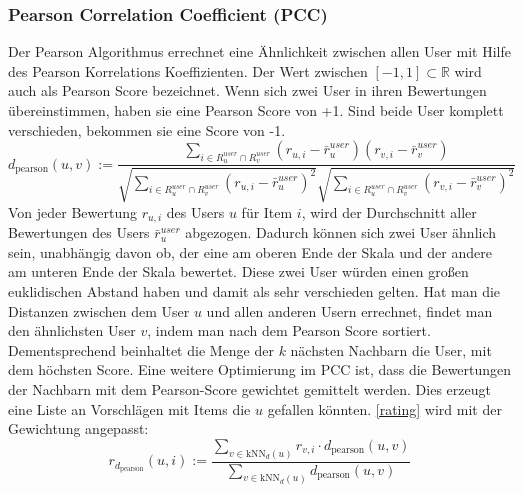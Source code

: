 \subsubsection{Pearson Correlation Coefficient (PCC)}\label{s.pearson}
Der Pearson Algorithmus errechnet eine Ähnlichkeit zwischen allen User mit Hilfe des Pearson Korrelations Koeffizienten. Der Wert zwischen $[-1,1]\subset \mathbb{R}$ wird auch als Pearson Score bezeichnet. Wenn sich zwei User in ihren Bewertungen übereinstimmen, haben sie eine Pearson Score von +1. Sind beide User komplett verschieden, bekommen sie eine Score von -1. 
\begin{equation}
	d_{\mathrm{pearson}}(u,v) := \dfrac{\sum\limits_{i \in R^{user}_{u}\cap R^{user}_{v}} (r_{u,i}-\bar{r}^{user}_{u})(r_{v,i}-\bar{r}^{user}_{v})}  {\sqrt{\sum\limits_{i \in R^{user}_{u}\cap R^{user}_{v}}(r_{u,i}-\bar{r}^{user}_{u})^2}\sqrt{\sum\limits_{i \in R^{user}_{u}\cap R^{user}_{v}}(r_{v,i}-\bar{r}^{user}_{v})^2}}
	 	\label{pccformula}
\end{equation}
Von jeder Bewertung $r_{u,i}$ des Users $u$ für Item $i$, wird der Durchschnitt aller Bewertungen des Users $\bar{r}^{user}_{u}$ abgezogen. Dadurch können sich zwei User ähnlich sein, unabhängig davon ob, der eine am oberen Ende der Skala und der andere am unteren Ende der Skala bewertet.
Diese zwei User würden einen großen euklidischen Abstand haben und damit als sehr verschieden gelten. Hat man die Distanzen zwischen dem User $u$ und allen anderen Usern errechnet, findet man den ähnlichsten User $v$, indem man nach dem Pearson Score sortiert. Dementsprechend beinhaltet die Menge der $k$ nächsten Nachbarn die User, mit dem höchsten Score. Eine weitere Optimierung im PCC ist, dass die Bewertungen der Nachbarn mit dem Pearson-Score gewichtet gemittelt werden. Dies erzeugt eine Liste an Vorschlägen mit Items die $u$ gefallen könnten. \autoref{rating} wird mit der Gewichtung angepasst:
\begin{equation}
r_{d_{\mathrm{pearson}}}(u,i) := \dfrac{\sum\limits_{v \in \mathrm{kNN}_{d}(u)} r_{v,i}\cdot d_{\mathrm{pearson}}(u,v)}{\sum\limits_{v \in \mathrm{kNN}_{d}(u)}d_{\mathrm{pearson}}(u,v)}  
\label{pearsonrating}
\end{equation}

